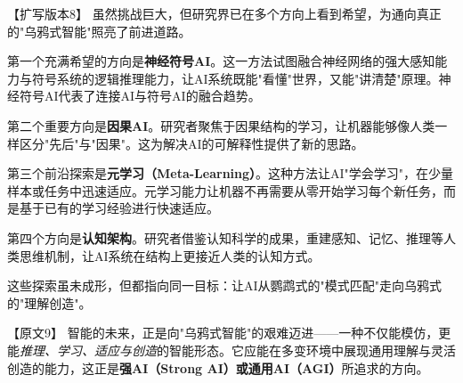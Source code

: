 【扩写版本8】
虽然挑战巨大，但研究界已在多个方向上看到希望，为通向真正的"乌鸦式智能"照亮了前进道路。

第一个充满希望的方向是\textbf{神经符号AI}。这一方法试图融合神经网络的强大感知能力与符号系统的逻辑推理能力，让AI系统既能"看懂"世界，又能"讲清楚"原理。神经符号AI代表了连接AI与符号AI的融合趋势。

第二个重要方向是\textbf{因果AI}。研究者聚焦于因果结构的学习，让机器能够像人类一样区分"先后"与"因果"。这为解决AI的可解释性提供了新的思路。

第三个前沿探索是\textbf{元学习（Meta-Learning）}。这种方法让AI"学会学习"，在少量样本或任务中迅速适应。元学习能力让机器不再需要从零开始学习每个新任务，而是基于已有的学习经验进行快速适应。

第四个方向是\textbf{认知架构}。研究者借鉴认知科学的成果，重建感知、记忆、推理等人类思维机制，让AI系统在结构上更接近人类的认知方式。

这些探索虽未成形，但都指向同一目标：让AI从鹦鹉式的"模式匹配"走向乌鸦式的"理解创造"。

【原文9】
智能的未来，正是向"乌鸦式智能"的艰难迈进——一种不仅能模仿，更能\emph{推理、学习、适应与创造}的智能形态。它应能在多变环境中展现通用理解与灵活创造的能力，这正是\textbf{强AI（Strong AI）或通用AI（AGI）}所追求的方向。

